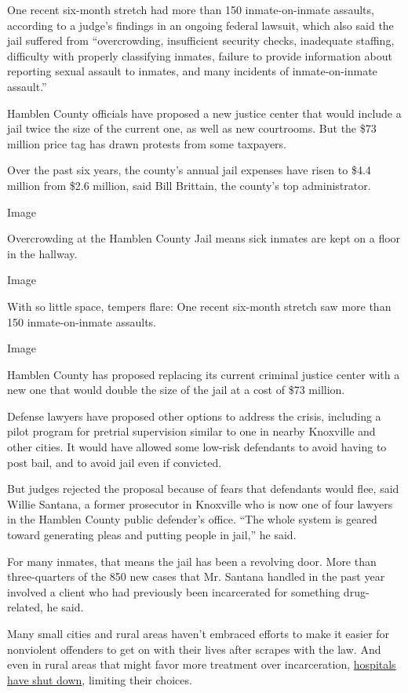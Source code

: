 One recent six-month stretch had more than 150 inmate-on-inmate
assaults, according to a judge's findings in an ongoing federal lawsuit,
which also said the jail suffered from ``overcrowding, insufficient
security checks, inadequate staffing, difficulty with properly
classifying inmates, failure to provide information about reporting
sexual assault to inmates, and many incidents of inmate-on-inmate
assault.''

Hamblen County officials have proposed a new justice center that would
include a jail twice the size of the current one, as well as new
courtrooms. But the \$73 million price tag has drawn protests from some
taxpayers.

Over the past six years, the county's annual jail expenses have risen to
\$4.4 million from \$2.6 million, said Bill Brittain, the county's top
administrator.

Image

Overcrowding at the Hamblen County Jail means sick inmates are kept on a
floor in the hallway.

Image

With so little space, tempers flare: One recent six-month stretch saw
more than 150 inmate-on-inmate assaults.

Image

Hamblen County has proposed replacing its current criminal justice
center with a new one that would double the size of the jail at a cost
of \$73 million.

Defense lawyers have proposed other options to address the crisis,
including a pilot program for pretrial supervision similar to one in
nearby Knoxville and other cities. It would have allowed some low-risk
defendants to avoid having to post bail, and to avoid jail even if
convicted.

But judges rejected the proposal because of fears that defendants would
flee, said Willie Santana, a former prosecutor in Knoxville who is now
one of four lawyers in the Hamblen County public defender's office.
``The whole system is geared toward generating pleas and putting people
in jail,'' he said.

For many inmates, that means the jail has been a revolving door. More
than three-quarters of the 850 new cases that Mr. Santana handled in the
past year involved a client who had previously been incarcerated for
something drug-related, he said.

Many small cities and rural areas haven't embraced efforts to make it
easier for nonviolent offenders to get on with their lives after scrapes
with the law. And even in rural areas that might favor more treatment
over incarceration,
\href{https://www.nytimes3xbfgragh.onion/2018/07/17/us/hospital-closing-missouri-pregnant.html}{hospitals
have shut down}, limiting their choices.

